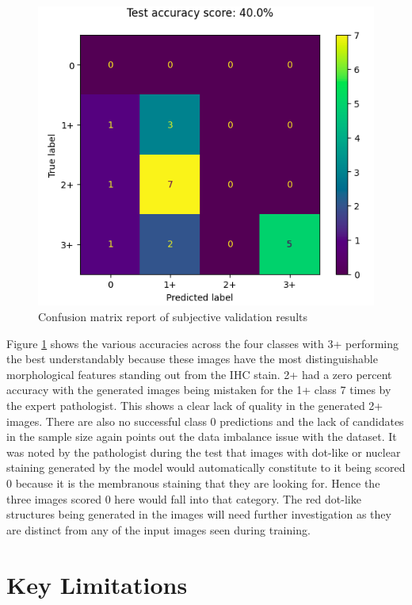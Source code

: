 \begin{figure}[h]
    \centering
    \includegraphics[width=1\linewidth]{5_Results/figures/subj-eval-confusion-matrix.png}
    \caption{Confusion matrix report of subjective validation results}
    \label{fig:conf-mat}
\end{figure}

Figure \ref{fig:conf-mat} shows the various accuracies across the four classes with 3+ performing the best understandably because these images have the most distinguishable morphological features standing out from the IHC stain. 2+ had a zero percent accuracy with the generated images being mistaken for the 1+ class 7 times by the expert pathologist. This shows a clear lack of quality in the generated 2+ images. There are also no successful class 0 predictions and the lack of candidates in the sample size again points out the data imbalance issue with the dataset. It was noted by the pathologist during the test that images with dot-like or nuclear staining generated by the model would automatically constitute to it being scored 0 because it is the membranous staining that they are looking for. Hence the three images scored 0 here would fall into that category. The red dot-like structures being generated in the images will need further investigation as they are distinct from any of the input images seen during training. 

\section{Key Limitations}

